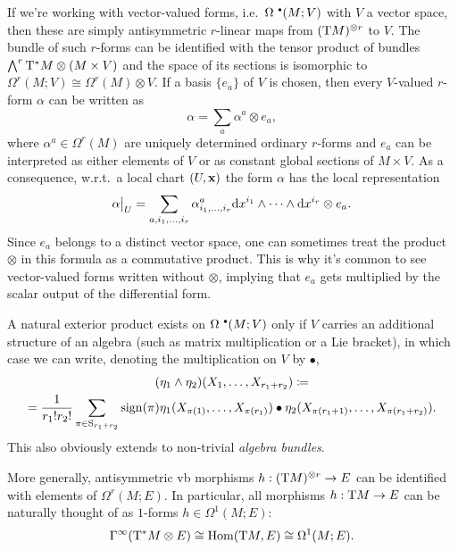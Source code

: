 \begin{example}
    If we're working with vector-valued forms, i.e.~$\Omega^{\smbullet }(M;V)$ with $V$ a vector space, then these are simply antisymmetric $r$-linear maps from $(\T M)^{\otimes r}$ to $V$. The bundle of such $r$-forms can be identified with the tensor product of bundles $\bigwedge^r \T^\ast M\otimes (M\times V)$ and the space of its sections is isomorphic to $\Omega^r(M;V)\cong \Omega^r(M)\otimes V$. If a basis $\{e_a\}$ of $V$ is chosen, then every $V$-valued $r$-form $\alpha$ can be written as
    \[\alpha=\sum_a \alpha^a\otimes e_a,\]
    where $\alpha^a\in \Omega^r(M)$ are uniquely determined ordinary $r$-forms and $e_a$ can be interpreted as either elements of $V$ or as constant global sections of $M\times V$. As a consequence, w.r.t.\ a local chart $(U,\bf{x})$ the form $\alpha$ has the local representation
    \[\restr{\alpha}{U}=\sum_{a,i_1,\ldots,i_r}\alpha^a_{i_1,\ldots,i_r}\dd x^{i_1}\wedge\cdots\wedge\dd x^{i_r}\otimes e_a.\]
    Since $e_a$ belongs to a distinct vector space, one can sometimes treat the product $\otimes$ in this formula as a commutative product. This is why it's common to see vector-valued forms written without $\otimes$, implying that $e_a$ gets multiplied by the scalar output of the differential form.

    A natural exterior product exists on $\Omega^{\smbullet }(M;V)$ only if $V$ carries an additional structure of an algebra (such as matrix multiplication or a Lie bracket), in which case we can write, denoting the multiplication on $V$ by $\bullet$,
    \begin{multline}
        (\eta_1\wedge\eta_2)(X_1,\ldots,X_{r_1+r_2})\coloneqq \\
        =\frac{1}{r_1!r_2!}\sum_{\pi\in \rmS_{r_1+r_2}}\sign(\pi)\eta_1(X_{\pi(1)},\ldots,X_{\pi(r_1)})\bullet \eta_2(X_{\pi(r_1+1)},\ldots,X_{\pi(r_1+r_2)}).\label{eq 2.4.17 RS1}
    \end{multline}
    This also obviously extends to non-trivial \emph{algebra bundles}.
\end{example}

\begin{example}
    More generally, antisymmetric \gls{vb} morphisms $h:(\T M)^{\otimes r}\to E$ can be identified with elements of $\Omega^r(M;E)$. In particular, all morphisms $h:\T M\to E$ can be naturally thought of as $1$-forms $h\in\Omega^1(M;E)$:
    \[\Gamma^\infty(\T^\ast M\otimes E)\cong \Hom(\T M,E)\cong \Omega^1(M;E).\]
\end{example}


